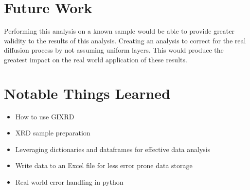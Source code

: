 \documentclass{article}
\begin{document}
\begin{multicols}{2}
\section{Future Work}

    Performing this analysis on a known sample would be able to provide greater validity to the results of this analysis.
    Creating an analysis to correct for the real diffusion process by not assuming uniform layers.
    This would produce the greatest impact on the real world application of these results.

\section{Notable Things Learned}

    \begin{itemize}
        \item How to use GIXRD
        \item XRD sample preparation
        \item Leveraging dictionaries and dataframes for effective data analysis
        \item Write data to an Excel file for less error prone data storage
        \item Real world error handling in python
    \end{itemize}




\end{multicols}

% 
\end{document}
